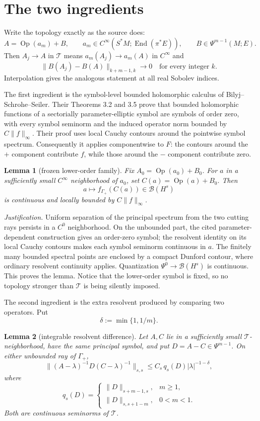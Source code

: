 \documentclass[11pt]{article}
\newtheorem{lemma}{Lemma}
\newcommand{\Op}{\operatorname{Op}}
\newcommand{\cB}{\mathcal B}
\newcommand{\cT}{\mathcal T}
\begin{document}
\section*{The two ingredients}
Write the topology exactly as the source does:
\[
 A=\Op(a_m)+B,\qquad
 a_m\in C^\infty(S^*M;\operatorname{End}(\pi^*E)),\qquad
 B\in\Psi^{m-1}(M;E).
\]
Then $A_j\to A$ in $\cT$ means $a_m(A_j)\to a_m(A)$ in $C^\infty$ and
\[
 \|B(A_j)-B(A)\|_{k+m-1,k}\longrightarrow0
 \quad\text{for every integer }k.                                      \tag{1}
\]
Interpolation gives the analogous statement at all real Sobolev indices.

The first ingredient is the symbol-level bounded holomorphic calculus of
Bilyj--Schrohe--Seiler.  Their Theorems 3.2 and 3.5 prove that bounded
holomorphic functions of a sectorially parameter-elliptic symbol are symbols
of order zero, with every symbol seminorm and the induced operator norm
bounded by $C\|f\|_\infty$.  Their proof uses local Cauchy contours around the
pointwise symbol spectrum.  Consequently it applies componentwise to $F$:
the contours around the $+$ component contribute $f$, while those around the
$-$ component contribute zero.

\begin{lemma}[frozen lower-order family]\label{lem:frozen}
Fix $A_0=\Op(a_0)+B_0$.  For $a$ in a sufficiently small $C^\infty$
neighborhood of $a_0$, set $C(a)=\Op(a)+B_0$.  Then
\[
 a\longmapsto f_{\Gamma_+}(C(a))\in\cB(H^s)
\]
is continuous and locally bounded by $C\|f\|_\infty$.
\end{lemma}

\emph{Justification.}
Uniform separation of the principal spectrum from the two cutting rays
persists in a $C^0$ neighborhood.  On the unbounded part, the cited
parameter-dependent construction gives an order-zero symbol; the resolvent
identity on its local Cauchy contours makes each symbol seminorm continuous
in $a$.  The finitely many bounded spectral points are enclosed by a compact
Dunford contour, where ordinary resolvent continuity applies.  Quantization
$\Psi^0\to\cB(H^s)$ is continuous.  This proves the lemma.  Notice that the
lower-order symbol is fixed, so no topology stronger than $\cT$ is being
silently imposed.

The second ingredient is the extra resolvent produced by comparing two
operators.  Put
\[
 \delta:=\min\{1,1/m\}.
\]

\begin{lemma}[integrable resolvent difference]\label{lem:two}
Let $A,C$ lie in a sufficiently small $\cT$-neighborhood, have the same
principal symbol, and put $D=A-C\in\Psi^{m-1}$.  On either unbounded ray of
$\Gamma_+$,
\[
 \|(A-\lambda)^{-1}D(C-\lambda)^{-1}\|_{s,s}
 \le C_s\,q_s(D)|\lambda|^{-1-\delta},                    \tag{2}
\]
where
\[
 q_s(D)=
 \begin{cases}
 \|D\|_{s+m-1,s},&m\ge1,\\
 \|D\|_{s,s+1-m},&0<m<1.
 \end{cases}
\]
Both are continuous seminorms of $\cT$.
\end{lemma}
\end{document}
